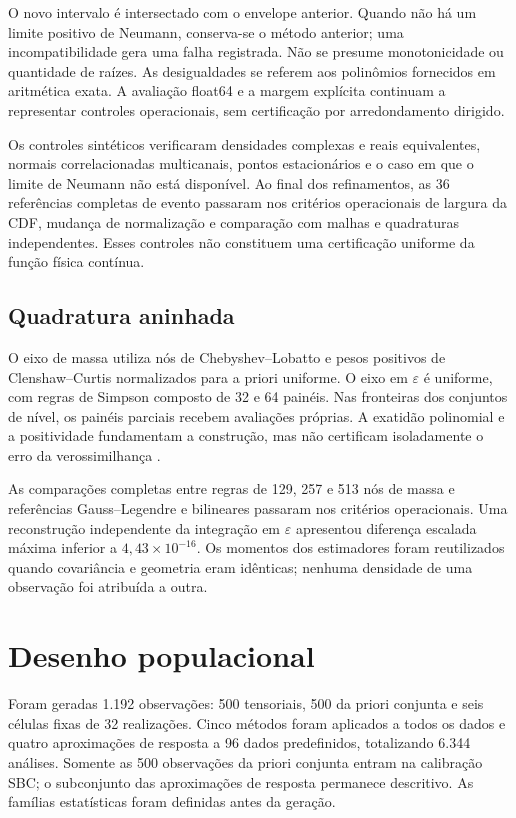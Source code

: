 O novo intervalo é intersectado com o envelope anterior. Quando não há um limite positivo de Neumann, conserva-se o método anterior; uma incompatibilidade gera uma falha registrada. Não se presume monotonicidade ou quantidade de raízes. As desigualdades se referem aos polinômios fornecidos em aritmética exata. A avaliação float64 e a margem explícita continuam a representar controles operacionais, sem certificação por arredondamento dirigido.


Os controles sintéticos verificaram densidades complexas e reais equivalentes, normais correlacionadas multicanais, pontos estacionários e o caso em que o limite de Neumann não está disponível. Ao final dos refinamentos, as 36 referências completas de evento passaram nos critérios operacionais de largura da CDF, mudança de normalização e comparação com malhas e quadraturas independentes. Esses controles não constituem uma certificação uniforme da função física contínua.

\subsection{Quadratura aninhada}

O eixo de massa utiliza nós de Chebyshev--Lobatto e pesos positivos de Clenshaw--Curtis normalizados para a priori uniforme. O eixo em $\varepsilon$ é uniforme, com regras de Simpson composto de 32 e 64 painéis. Nas fronteiras dos conjuntos de nível, os painéis parciais recebem avaliações próprias. A exatidão polinomial e a positividade fundamentam a construção, mas não certificam isoladamente o erro da verossimilhança \autocite{trefethen2021exactness}.

As comparações completas entre regras de 129, 257 e 513 nós de massa e referências Gauss--Legendre e bilineares passaram nos critérios operacionais. Uma reconstrução independente da integração em $\varepsilon$ apresentou diferença escalada máxima inferior a $4{,}43\times10^{-16}$. Os momentos dos estimadores foram reutilizados quando covariância e geometria eram idênticas; nenhuma densidade de uma observação foi atribuída a outra.

\section{Desenho populacional}

Foram geradas 1.192 observações: 500 tensoriais, 500 da priori conjunta e seis células fixas de 32 realizações. Cinco métodos foram aplicados a todos os dados e quatro aproximações de resposta a 96 dados predefinidos, totalizando 6.344 análises. Somente as 500 observações da priori conjunta entram na calibração SBC; o subconjunto das aproximações de resposta permanece descritivo. As famílias estatísticas foram definidas antes da geração.

